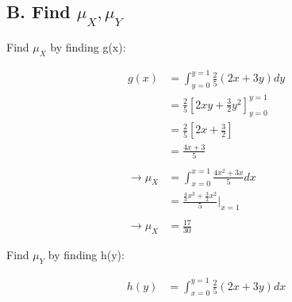 \documentclass[]{article}
\begin{document}
		\pagebreak
		\subsection{B. Find $\mu_X, \mu_Y$}
			Find $\mu_X$ by finding g(x):
			
			\begin{align*}
				g(x)  &= \int_{y=0}^{y=1}\frac{2}{5}(2x+3y)dy \\
				&= \frac{2}{5}[2xy + \frac{3}{2}y^2]_{y=0}^{y=1} \\
				&= \frac{2}{5}[2x + \frac{3}{2}] \\
				&= \frac{4x + 3}{5} \\\\
				\to \mu_X &= \int_{x=0}^{x=1}\frac{4x^2+3x}{5}dx \\
				&= \frac{\frac{4}{3}x^3 + \frac{3}{2}x^2}{5}|_{x=1} \\\\
				\to \mu_X &= \frac{17}{30}
			\end{align*}
			
			Find $\mu_Y$ by finding h(y):
			
			\begin{align*}
				h(y)  &= \int_{x=0}^{y=1}\frac{2}{5}(2x+3y)dx
			\end{align*}
\end{document}
